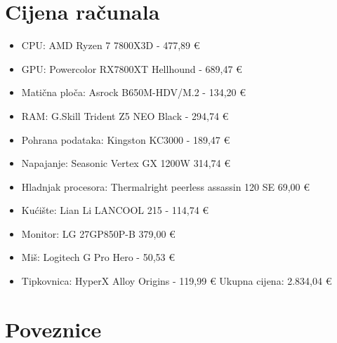 \documentclass{article}
\begin{document}
\section{Cijena računala}
\begin{itemize}
    \item CPU: AMD Ryzen 7 7800X3D - 477,89 €
    \item GPU: Powercolor RX7800XT Hellhound - 689,47 €
    \item Matična ploča: Asrock B650M-HDV/M.2 - 134,20 €
    \item RAM: G.Skill Trident Z5 NEO Black - 294,74 €
    \item Pohrana podataka: Kingston KC3000 - 189,47 €
    \item Napajanje: Seasonic Vertex GX 1200W 314,74 €
    \item Hladnjak procesora: Thermalright peerless assassin 120 SE 69,00 €
    \item Kućište: Lian Li LANCOOL 215 - 114,74 €
    \item Monitor: LG 27GP850P-B 379,00 €
    \item Miš: Logitech G Pro Hero - 50,53 €
    \item Tipkovnica: HyperX Alloy Origins - 119,99 €
    \newline 
    \newline Ukupna cijena: 2.834,04 €
\end{itemize}

\section{Poveznice}
\end{document}
